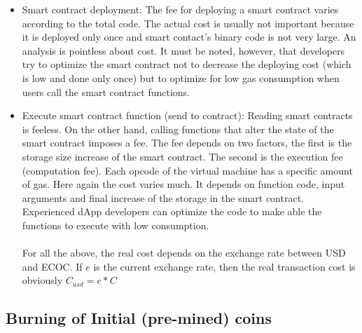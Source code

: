 \documentclass{article}
\begin{document}
\begin{itemize}
\item Smart contract deployment:
The fee for deploying a smart contract varies according to the total code. The actual cost is usually not important because it is deployed only once and smart contact's binary code is not very large. An analysis is pointless about cost. It must be noted, however, that developers try to optimize the smart contract not to decrease the deploying cost (which is low and done only once) but to optimize for low gas consumption when users call the smart contract functions.
\item Execute smart contract function (send to contract):
Reading smart contracts is feeless. On the other hand, calling functions that alter the state of the smart contract imposes a fee. The fee depends on two factors, the first is the storage size increase of the smart contract. The second is the execution fee (computation fee). Each opcode of the virtual machine has a specific amount of gas. Here again the cost varies much. It depends on function code, input arguments and final increase of the storage in the smart contract. Experienced dApp developers can optimize the code to make able the functions to execute with low consumption.

\paragraph{}
For all the above, the real cost depends on the exchange rate between USD and ECOC. If $e$ is the current exchange rate, then the real transaction cost is obviously $C_{usd}=e*C$

\end{itemize}


\subsection{Burning of Initial (pre-mined) coins}
\end{document}
